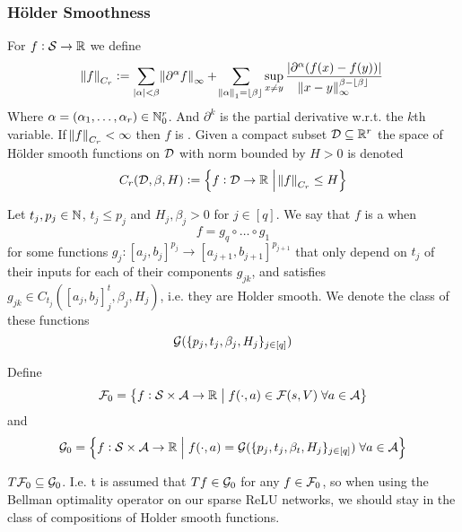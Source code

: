 

\subsubsection{Hölder Smoothness} %
\begin{defn}
  For $f : \mathcal{S} \to \mathbb{R}$ we define
  \begin{equation}
    \norm{f}_{C_r} \vcentcolon= 
    \sum_{|{\alpha}| < \beta}
    \norm{\partial^{\alpha}f}_\infty +
    \sum_{\norm{{\alpha}}_1 = \lfloor\beta\rfloor}
    \sup_{x \neq y} \frac{|\partial^\alpha (f(x) - f(y))|}
  {\norm{x-y}_\infty^{\beta-\lfloor\beta\rfloor}}
  \end{equation}
  Where $\alpha = (\alpha_1, \dots, \alpha_r) \in \mathbb{N}_0^r$.
  And $\partial^k$ is the partial derivative w.r.t. the $k$th variable.
  If $\norm{f}_{C_r} < \infty$ then $f$ is .
  Given a compact subset $\mathcal{D} \subseteq \mathbb{R}^r$
  the space of Hölder smooth functions on $\mathcal{D}$ with norm bounded by
  $H > 0$ is denoted
  \[ C_r(\mathcal{D}, \beta, H) \vcentcolon=
  \left\{ f : \mathcal{D} \to \mathbb{R} \;\middle\vert\; \norm{f}_{C_r} \leq H \right\} \]
\end{defn}

\begin{defn}
  Let $t_j, p_j \in \mathbb{N}$, $t_j\leq p_j$ and $H_j, \beta_j > 0$ for $j \in [q]$.
  We say that $f$ is a  when
  \[ f = g_q \circ \dots \circ g_1 \]
  for some functions $g_j : [a_j, b_j]^{p_j} \to [a_{j+1}, b_{j+1}]^{p_{j+1}}$
  that only depend on $t_j$ of their inputs
  for each of their components $g_{jk}$,
  and satisfies $g_{jk} \in C_{t_j}([a_j, b_j]^t_j, \beta_j, H_j)$, 
  i.e. they are Holder smooth.
  We denote the class of these functions
  \[ \mathcal{G}(\{p_j, t_j, \beta_j, H_j\}_{j \in [q]}) \]
\end{defn}

\begin{defn}
  Define
  \[ \mathcal{F}_0 = \left\{ f : \mathcal{S} \times \mathcal{A} \to \mathbb{R} \;\middle\vert\;
  f(\cdot, a) \in \mathcal{F}(s, V) \; \forall a \in \mathcal{A} \right\} \]
  and
  \[ \mathcal{G}_0 = \left\{ f : \mathcal{S} \times \mathcal{A} \to \mathbb{R}
      \;\middle\vert\; f(\cdot, a) = \mathcal{G}(\{p_j, t_j, \beta_t, H_j\}_{j \in [q]})
  \; \forall a \in \mathcal{A} \right\} \]
\end{defn}

\begin{asm}\label{asm:A1}
  $ T \mathcal{F}_0 \subseteq \mathcal{G}_0$.
  I.e. t is assumed that $T f \in \mathcal{G}_0$ for any $f \in \mathcal{F}_0$, 
  so when using the Bellman optimality operator on our sparse ReLU networks,
  we should stay in the class of compositions of Holder smooth functions.
\end{asm}

